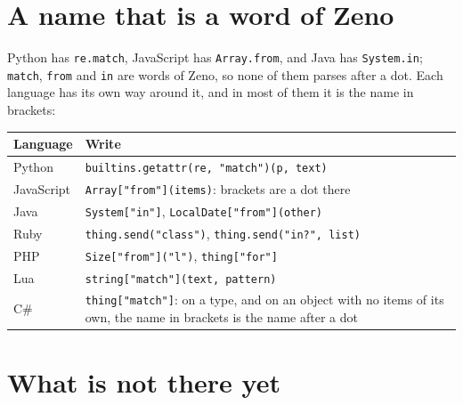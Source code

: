 \section{A name that is a word of Zeno}

Python has \verb|re.match|, JavaScript has \verb|Array.from|, and Java
has \verb|System.in|; \verb|match|, \verb|from| and \verb|in| are
words of Zeno, so none of them parses after a dot. Each language has
its own way around it, and in most of them it is the name in
brackets:

\begin{center}
\begin{tabular}{lP{8.4cm}}
\toprule
Language & Write \\
\midrule
Python & \verb|builtins.getattr(re, "match")(p, text)| \\
JavaScript & \verb|Array["from"](items)|: brackets are a dot there \\
Java & \verb|System["in"]|, \verb|LocalDate["from"](other)| \\
Ruby & \verb|thing.send("class")|, \verb|thing.send("in?", list)| \\
PHP & \verb|Size["from"]("l")|, \verb|thing["for"]| \\
Lua & \verb|string["match"](text, pattern)| \\
C\# & \verb|thing["match"]|: on a type, and on an object with no
  items of its own, the name in brackets is the name after a dot \\
\bottomrule
\end{tabular}
\end{center}

\section{What is not there yet}

